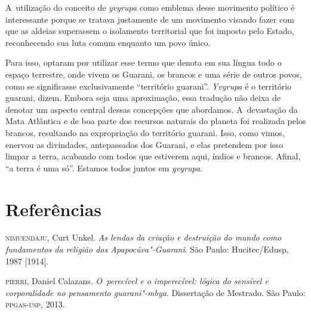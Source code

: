 A~utilização do conceito de \emph{yvyrupa} como emblema desse movimento
político é interessante porque se tratava justamente de um movimento
visando fazer com que as aldeias superassem o isolamento territorial
que foi imposto pelo Estado, reconhecendo sua luta comum enquanto um
povo único.

Para isso, optaram por utilizar esse termo que denota em sua língua todo
o espaço terrestre, onde vivem os Guarani, os brancos e uma série de
outros povos, como se significasse exclusivamente ``território guarani''.
\emph{Yvyrupa} é o território guarani, dizem. Embora seja uma aproximação,
essa tradução não deixa de denotar um aspecto central dessas concepções
que abordamos. A~devastação da Mata Atlântica e de boa parte dos
recursos naturais do planeta foi realizada pelos brancos, resultando na
expropriação do território guarani. Isso, como vimos, enervou as
divindades, antepassados dos Guarani, e elas pretendem por isso limpar
a terra, acabando com todos que estiverem aqui, índios e brancos.
Afinal, ``a terra é uma só''. Estamos todos juntos em \emph{yvyrupa}.

\section{Referências}

\begin{Parskip}
\textsc{nimuendaju}, Curt Unkel. \emph{As lendas da criação e destruição do mundo
como fundamentos da religião dos Apapocúva"-Guarani}. São Paulo: Hucitec/Edusp, 1987 [1914].

\textsc{pierri}, Daniel Calazans. \emph{O~perecível e o imperecível: lógica do
sensível e corporalidade no pensamento guarani"-mbya}. Dissertação de
Mestrado. São Paulo: \textsc{ppgas}-\textsc{usp}, 2013.
\end{Parskip}

\clearpage

\vspace*{\fill}

